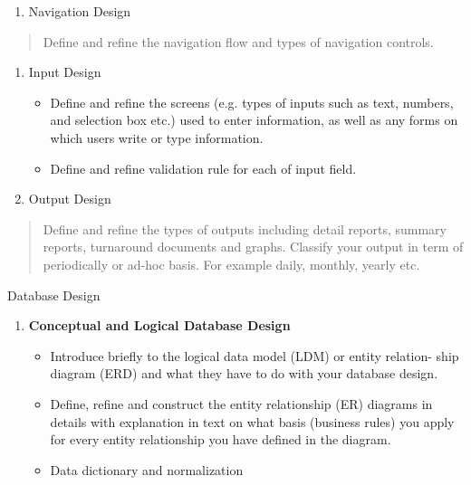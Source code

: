 \begin{enumerate}
\def\labelenumi{\alph{enumi}.}
\item
  Navigation Design
\end{enumerate}

\begin{quote}
Define and refine the navigation flow and types of navigation controls.
\end{quote}

\begin{enumerate}
\def\labelenumi{\alph{enumi}.}
\setcounter{enumi}{1}
\item
  Input Design

  \begin{itemize}
  \item
    Define and refine the screens (e.g. types of inputs such as text,
    numbers, and selection box etc.) used to enter information, as well
    as any forms on which users write or type information.
  \item
    Define and refine validation rule for each of input field.
  \end{itemize}
\item
  Output Design
\end{enumerate}

\begin{quote}
Define and refine the types of outputs including detail reports, summary
reports, turnaround documents and graphs. Classify your output in term
of periodically or ad-hoc basis. For example daily, monthly, yearly etc.
\end{quote}

Database Design

\begin{enumerate}
\def\labelenumi{\arabic{enumi}.}
\item
  \textbf{Conceptual and Logical Database Design}

  \begin{itemize}
  \item
    Introduce briefly to the logical data model (LDM) or entity
    relation- ship diagram (ERD) and what they have to do with your
    database design.
  \item
    Define, refine and construct the entity relationship (ER) diagrams
    in details with explanation in text on what basis (business rules)
    you apply for every entity relationship you have defined in the
    diagram.
  \item
    Data dictionary and normalization
  \end{itemize}
\end{enumerate}

